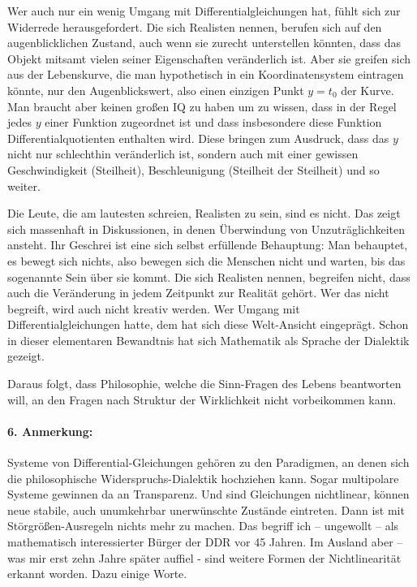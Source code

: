 \documentclass[11pt,a4paper]{article}
\begin{document}
Wer auch nur ein wenig Umgang mit Differentialgleichungen hat, fühlt sich zur
Widerrede herausgefordert. Die sich Realisten nennen, berufen sich auf den
augenblicklichen Zustand, auch wenn sie zurecht unterstellen könnten, dass das
Objekt mitsamt vielen seiner Eigenschaften veränderlich ist. Aber sie greifen
sich aus der Lebenskurve, die man hypothetisch in ein Koordinatensystem
eintragen könnte, nur den Augenblickswert, also einen einzigen Punkt $y = t_0$
der Kurve. Man braucht aber keinen großen IQ zu haben um zu wissen, dass in
der Regel jedes $y$ einer Funktion zugeordnet ist und dass insbesondere diese
Funktion Differentialquotienten enthalten wird. Diese bringen zum Ausdruck,
dass das $y$ nicht nur schlechthin veränderlich ist, sondern auch mit einer
gewissen Geschwindigkeit (Steilheit), Beschleunigung (Steilheit der Steilheit)
und so weiter.

Die Leute, die am lautesten schreien, Realisten zu sein, sind es nicht. Das
zeigt sich massenhaft in Diskussionen, in denen Überwindung von
Unzuträglichkeiten ansteht. Ihr Geschrei ist eine sich selbst erfüllende
Behauptung: Man behauptet, es bewegt sich nichts, also bewegen sich die
Menschen nicht und warten, bis das sogenannte Sein über sie kommt. Die sich
Realisten nennen, begreifen nicht, dass auch die Veränderung in jedem
Zeitpunkt zur Realität gehört. Wer das nicht begreift, wird auch nicht kreativ
werden. Wer Umgang mit Differentialgleichungen hatte, dem hat sich diese
Welt-Ansicht eingeprägt. Schon in dieser elementaren Bewandtnis hat sich
Mathematik als Sprache der Dialektik gezeigt.

Daraus folgt, dass Philosophie, welche die Sinn-Fragen des Lebens beantworten
will, an den Fragen nach Struktur der Wirklichkeit nicht vorbeikommen kann.

\paragraph{6. Anmerkung:}
Systeme von Differential-Gleichungen gehören zu den Paradigmen, an denen sich
die philosophische Widerspruchs-Dialektik hochziehen kann. Sogar multipolare
Systeme gewinnen da an Transparenz. Und sind Gleichungen nichtlinear, können
neue stabile, auch unumkehrbar unerwünschte Zustände eintreten. Dann ist mit
Störgrößen-Ausregeln nichts mehr zu machen. Das begriff ich – ungewollt -- als
mathematisch interessierter Bürger der DDR vor 45 Jahren. Im Ausland aber –
was mir erst zehn Jahre später auffiel - sind weitere Formen der
Nichtlinearität erkannt worden. Dazu einige Worte.
\end{document}
